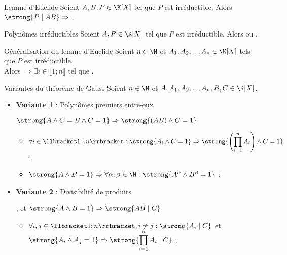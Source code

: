 \documentclass[12pt,a4paper]{report}
\begin{document}
        \begin{lemme}{Lemme d'Euclide}{}
        Soient $A, B, P \in \K[X]$ tel que $P$ est irréductible. Alors $\strong{P \mid AB} \Rightarrow$ .
        \end{lemme}
        
        \begin{lemme}{Polynômes irréductibles}{}
        Soient $A, P \in \K[X]$ tel que $P$ est irréductible. Alors  ou .
        \end{lemme}
        
        \begin{corollaire}{Généralisation du lemme d'Euclide}{}
        Soient $n \in \N$ et $A_1, A_2, ..., A_n \in \K[X]$ tels que $P$ est irréductible.\\
        Alors  $\Rightarrow \exists i \in \llbracket 1 ; n \rrbracket$ tel que .
        \end{corollaire}
        
        \begin{propositions}{Variantes du théorème de Gauss}{}
        Soient $n \in \N$ et $A, A_1, A_2, ..., A_n, B, C \in \K[X]$.
        \begin{itemize}
        \item \textbf{Variante 1} : Polynômes premiers entre-eux 
        \begin{center}
            $\strong{A \wedge C = B \wedge C = 1} \Rightarrow \strong{(AB) \wedge C = 1}$ 
        \end{center}
        
            \begin{itemize}
                \item $\forall i \in \llbracket 1 : n \rrbracket : \strong{A_i \wedge C = 1} \Rightarrow \strong{\left( \displaystyle \prod_{i = 1}^n A_i \right) \wedge C = 1}$ ;
                \item $\strong{A \wedge B = 1} \Rightarrow \forall \alpha, \beta \in \N : \strong{A^\alpha \wedge B^\beta = 1}$ ;
            \end{itemize}
        
        \item \textbf{Variante 2} : Divisibilité de produits 
        \begin{center}
            ,  et $\strong{A \wedge B = 1} \Rightarrow \strong{AB \mid C}$
        \end{center}
            
            \begin{itemize}
                \item $\forall i, j \in \llbracket 1 ; n \rrbracket, i \neq j : \strong{A_i \mid C}$ et $\strong{A_i \wedge A_j = 1} \Rightarrow \displaystyle \strong{\prod_{i = 1}^n A_i \mid C}$ ;
            \end{itemize}
        \end{itemize}
        \end{propositions}
        
\end{document}
